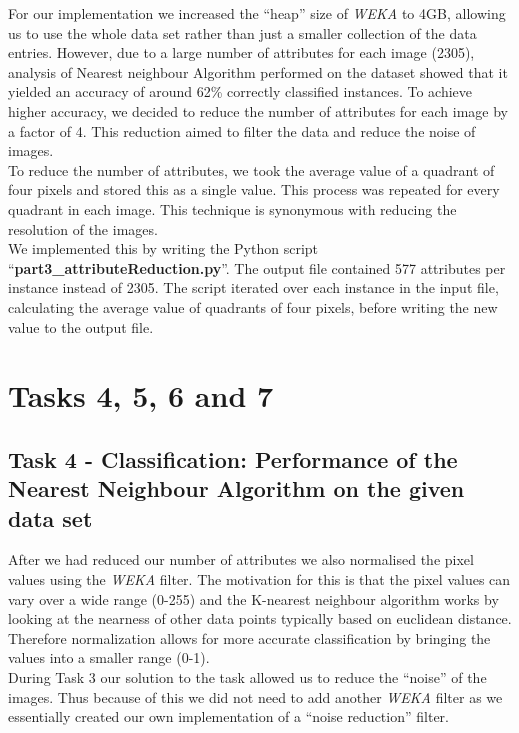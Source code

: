 \documentclass[12pt]{article}
\begin{document}
For our implementation we increased the “heap” size of \textit{WEKA} to 4GB, allowing us to use the whole data set rather than just a smaller collection of the data entries. However, due to a large number of attributes for each image (2305), analysis of Nearest neighbour Algorithm performed on the dataset showed that it yielded an accuracy of around 62\% correctly classified instances. To achieve higher accuracy, we decided to reduce the number of attributes for each image by a factor of 4. This reduction aimed to filter the data and reduce the noise of images.\\

To reduce the number of attributes, we took the average value of a quadrant of four pixels and stored this as a single value. This process was repeated for every quadrant in each image. This technique is synonymous with reducing the resolution of the images.\\

We implemented this by writing the Python script ``\textbf{part3\_attributeReduction.py}''. The output file contained 577 attributes per instance instead of 2305. The script iterated over each instance in the input file, calculating the average value of quadrants of four pixels, before writing the new value to the output file.\\

\newpage
\section{Tasks 4, 5, 6 and 7}

\subsection{Task 4 - Classification: Performance of the Nearest Neighbour Algorithm on the given data set}

After we had reduced our number of attributes we also normalised the pixel values using the \textit{WEKA} filter. The motivation for this is that the pixel values can vary over a wide range (0-255) and the K-nearest neighbour algorithm works by looking at the nearness of other data points typically based on euclidean distance. Therefore normalization allows for more accurate classification by bringing the values into a smaller range (0-1).\\

During Task 3 our solution to the task allowed us to reduce the “noise” of the images. Thus because of this we did not need to add another \textit{WEKA} filter as we essentially created our own implementation of a “noise reduction” filter.\\ 
\end{document}
